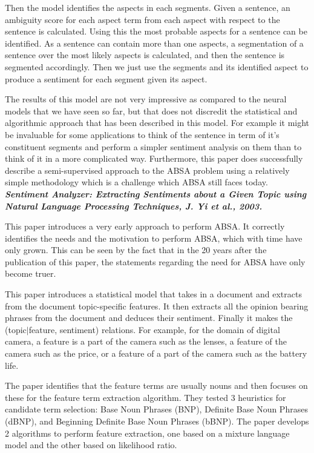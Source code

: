 \documentclass[conference]{IEEEtran}
\begin{document}
Then the model identifies the aspects in each segments. Given a sentence, an ambiguity score for each aspect term from each aspect with respect to the sentence is calculated. Using this the most probable aspects for a sentence can be identified. As a sentence can contain more than one aspects, a segmentation of a sentence over the most likely aspects is calculated, and then the sentence is segmented accordingly. Then we just use the segments and its identified aspect to produce a sentiment for each segment given its aspect.

The results of this model are not very impressive as compared to the neural models that we have seen so far, but that does not discredit the statistical and algorithmic approach that has been described in this model. For example it might be invaluable for some applications to think of the sentence in term of it's constituent segments and perform a simpler sentiment analysis on them than to think of it in a more complicated way. Furthermore, this paper does successfully describe a semi-supervised approach to the ABSA problem using a relatively simple methodology which is a challenge which ABSA still faces today.\\

\textit{\textbf{Sentiment Analyzer: Extracting Sentiments about a Given Topic using Natural Language Processing Techniques, J. Yi et al., 2003.}}

This paper introduces a very early approach to perform ABSA. It correctly identifies the needs and the motivation to perform ABSA, which with time have only grown. This can be seen by the fact that in the 20 years after the publication of this paper, the statements regarding the need for ABSA have only become truer.

This paper introduces a statistical model that takes in a document and extracts from the document topic-specific features. It then extracts all the opinion bearing phrases from the document and deduces their sentiment. Finally it makes the (topic$\mid$feature, sentiment) relations. For example, for the domain of digital camera, a feature is a part of the camera such as the lenses, a feature of the camera such as the price, or a feature of a part of the camera such as the battery life.

The paper identifies that the feature terms are usually nouns and then focuses on these for the feature term extraction algorithm. They tested 3 heuristics for candidate term selection: Base Noun Phrases (BNP),  Definite Base Noun Phrases (dBNP), and Beginning Definite Base Noun Phrases (bBNP). The paper develops 2 algorithms to perform feature extraction, one based on a mixture language model and the other based on likelihood ratio.
\end{document}
